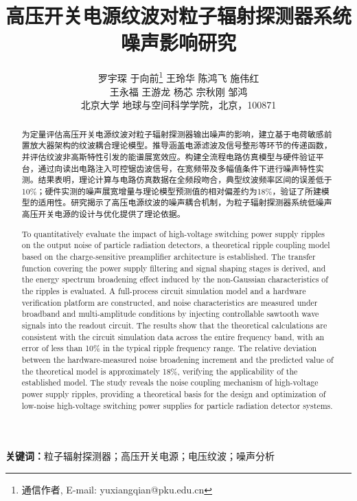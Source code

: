 \documentclass[12pt,fontset=fandol]{ctexart}
\title{高压开关电源纹波对粒子辐射探测器系统噪声影响研究}
\author{罗宇琛 \quad 于向前\thanks{通信作者, E-mail: yuxiangqian@pku.edu.cn} \quad 王玲华 \quad 陈鸿飞 \quad 施伟红 \\
王永福 \quad 王游龙 \quad 杨芯 \quad 宗秋刚 \quad 邹鸿\\
北京大学 地球与空间科学学院，北京，100871}
\date{}
\begin{document}
\maketitle

\begin{abstract}
为定量评估高压开关电源纹波对粒子辐射探测器输出噪声的影响，建立基于电荷敏感前置放大器架构的纹波耦合理论模型。推导涵盖电源滤波及信号整形等环节的传递函数，并评估纹波非高斯特性引发的能谱展宽效应。构建全流程电路仿真模型与硬件验证平台，通过向读出电路注入可控锯齿波信号，在宽频带及多幅值条件下进行噪声特性实测。结果表明，理论计算与电路仿真数据在全频段吻合，典型纹波频率区间的误差低于10\%；硬件实测的噪声展宽增量与理论模型预测值的相对偏差约为18\%，验证了所建模型的适用性。研究揭示了高压电源纹波的噪声耦合机制，为粒子辐射探测器系统低噪声高压开关电源的设计与优化提供了理论依据。
\end{abstract}

\noindent\textbf{关键词：}粒子辐射探测器；高压开关电源；电压纹波；噪声分析

\renewcommand{\abstractname}{Abstract}
\begin{abstract}
To quantitatively evaluate the impact of high-voltage switching power supply ripples on the output noise of particle radiation detectors, a theoretical ripple coupling model based on the charge-sensitive preamplifier architecture is established. The transfer function covering the power supply filtering and signal shaping stages is derived, and the energy spectrum broadening effect induced by the non-Gaussian characteristics of the ripples is evaluated. A full-process circuit simulation model and a hardware verification platform are constructed, and noise characteristics are measured under broadband and multi-amplitude conditions by injecting controllable sawtooth wave signals into the readout circuit. The results show that the theoretical calculations are consistent with the circuit simulation data across the entire frequency band, with an error of less than 10\% in the typical ripple frequency range. The relative deviation between the hardware-measured noise broadening increment and the predicted value of the theoretical model is approximately 18\%, verifying the applicability of the established model. The study reveals the noise coupling mechanism of high-voltage power supply ripples, providing a theoretical basis for the design and optimization of low-noise high-voltage switching power supplies for particle radiation detector systems.
\end{abstract}
\end{document}
